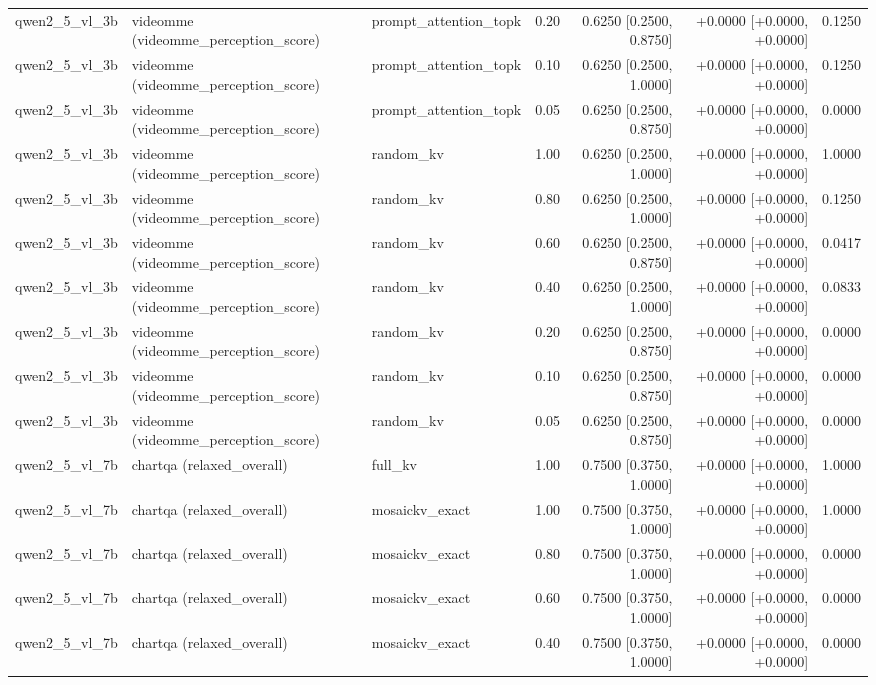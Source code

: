 \begin{longtable}{lllrrrr}
qwen2\_5\_vl\_3b & videomme (videomme\_perception\_score) & prompt\_attention\_topk & 0.20 & 0.6250 [0.2500, 0.8750] & +0.0000 [+0.0000, +0.0000] & 0.1250 \\
qwen2\_5\_vl\_3b & videomme (videomme\_perception\_score) & prompt\_attention\_topk & 0.10 & 0.6250 [0.2500, 1.0000] & +0.0000 [+0.0000, +0.0000] & 0.1250 \\
qwen2\_5\_vl\_3b & videomme (videomme\_perception\_score) & prompt\_attention\_topk & 0.05 & 0.6250 [0.2500, 0.8750] & +0.0000 [+0.0000, +0.0000] & 0.0000 \\
qwen2\_5\_vl\_3b & videomme (videomme\_perception\_score) & random\_kv & 1.00 & 0.6250 [0.2500, 1.0000] & +0.0000 [+0.0000, +0.0000] & 1.0000 \\
qwen2\_5\_vl\_3b & videomme (videomme\_perception\_score) & random\_kv & 0.80 & 0.6250 [0.2500, 1.0000] & +0.0000 [+0.0000, +0.0000] & 0.1250 \\
qwen2\_5\_vl\_3b & videomme (videomme\_perception\_score) & random\_kv & 0.60 & 0.6250 [0.2500, 0.8750] & +0.0000 [+0.0000, +0.0000] & 0.0417 \\
qwen2\_5\_vl\_3b & videomme (videomme\_perception\_score) & random\_kv & 0.40 & 0.6250 [0.2500, 1.0000] & +0.0000 [+0.0000, +0.0000] & 0.0833 \\
qwen2\_5\_vl\_3b & videomme (videomme\_perception\_score) & random\_kv & 0.20 & 0.6250 [0.2500, 0.8750] & +0.0000 [+0.0000, +0.0000] & 0.0000 \\
qwen2\_5\_vl\_3b & videomme (videomme\_perception\_score) & random\_kv & 0.10 & 0.6250 [0.2500, 0.8750] & +0.0000 [+0.0000, +0.0000] & 0.0000 \\
qwen2\_5\_vl\_3b & videomme (videomme\_perception\_score) & random\_kv & 0.05 & 0.6250 [0.2500, 0.8750] & +0.0000 [+0.0000, +0.0000] & 0.0000 \\
qwen2\_5\_vl\_7b & chartqa (relaxed\_overall) & full\_kv & 1.00 & 0.7500 [0.3750, 1.0000] & +0.0000 [+0.0000, +0.0000] & 1.0000 \\
qwen2\_5\_vl\_7b & chartqa (relaxed\_overall) & mosaickv\_exact & 1.00 & 0.7500 [0.3750, 1.0000] & +0.0000 [+0.0000, +0.0000] & 1.0000 \\
qwen2\_5\_vl\_7b & chartqa (relaxed\_overall) & mosaickv\_exact & 0.80 & 0.7500 [0.3750, 1.0000] & +0.0000 [+0.0000, +0.0000] & 0.0000 \\
qwen2\_5\_vl\_7b & chartqa (relaxed\_overall) & mosaickv\_exact & 0.60 & 0.7500 [0.3750, 1.0000] & +0.0000 [+0.0000, +0.0000] & 0.0000 \\
qwen2\_5\_vl\_7b & chartqa (relaxed\_overall) & mosaickv\_exact & 0.40 & 0.7500 [0.3750, 1.0000] & +0.0000 [+0.0000, +0.0000] & 0.0000 \\

\end{longtable}
